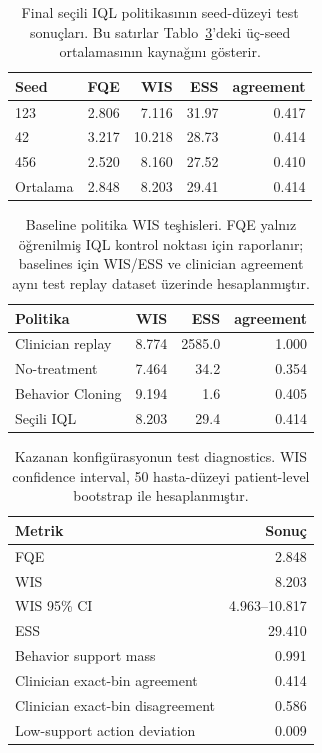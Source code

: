 \documentclass[conference]{IEEEtran}
\begin{document}
\begin{table}[t]
\centering
\caption{Final seçili IQL politikasının seed-düzeyi test sonuçları. Bu satırlar Tablo~\ref{tab:baseline}'deki üç-seed ortalamasının kaynağını gösterir.}
\label{tab:seed_level}
\begin{tabular}{lrrrr}
\toprule
Seed & FQE & WIS & ESS & agreement \\
\midrule
123 & 2.806 & 7.116 & 31.97 & 0.417 \\
42 & 3.217 & 10.218 & 28.73 & 0.414 \\
456 & 2.520 & 8.160 & 27.52 & 0.410 \\
\midrule
Ortalama & 2.848 & 8.203 & 29.41 & 0.414 \\
\bottomrule
\end{tabular}
\end{table}

\begin{table}[t]
\centering
\caption{Baseline politika WIS teşhisleri. FQE yalnız öğrenilmiş IQL kontrol noktası için raporlanır; baselines için WIS/ESS ve clinician agreement aynı test replay dataset üzerinde hesaplanmıştır.}
\label{tab:reference_policies}
\begin{tabular}{lrrr}
\toprule
Politika & WIS & ESS & agreement \\
\midrule
Clinician replay & 8.774 & 2585.0 & 1.000 \\
No-treatment & 7.464 & 34.2 & 0.354 \\
Behavior Cloning & 9.194 & 1.6 & 0.405 \\
Seçili IQL & 8.203 & 29.4 & 0.414 \\
\bottomrule
\end{tabular}
\end{table}

\begin{table}[t]
\centering
\caption{Kazanan konfigürasyonun test diagnostics. WIS confidence interval, 50 hasta-düzeyi patient-level bootstrap ile hesaplanmıştır.}
\label{tab:baseline}
\begin{tabular}{lr}
\toprule
Metrik & Sonuç \\
\midrule
FQE & 2.848 \\
WIS & 8.203 \\
WIS 95\% CI & 4.963--10.817 \\
ESS & 29.410 \\
Behavior support mass & 0.991 \\
Clinician exact-bin agreement & 0.414 \\
Clinician exact-bin disagreement & 0.586 \\
Low-support action deviation & 0.009 \\
\bottomrule
\end{tabular}
\end{table}
\end{document}
